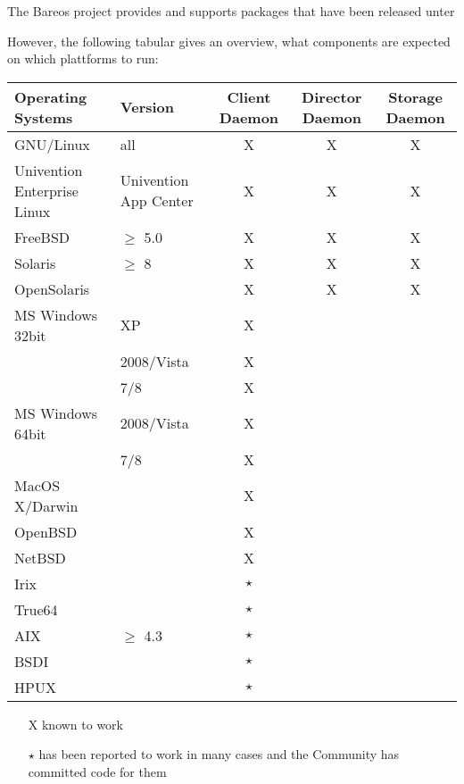 

The Bareos project provides and supports packages that have been released unter

However, the following tabular gives an overview, what components are expected on which plattforms to run:

\begin{tabular}[h]{|l|l|c|c|c|}
  \hline
  Operating Systems & Version & Client \small{Daemon} & Director \small{Daemon} & Storage \small{Daemon} \\
  \hline
  \hline
  GNU/Linux  & all & X & X & X \\
  \hline
  Univention Enterprise Linux & Univention App Center & X & X & X \\
  \hline
  FreeBSD & $\geq$ 5.0 & X & X & X
  \\
  \hline
  Solaris & $\geq$ 8 & X & X & X \\
  \hline
  OpenSolaris & ~ & X & X & X \\
  \hline
  \hline
  MS Windows 32bit & XP & X  &  &  \\
  ~ & 2008/Vista & X  &  &  \\
  ~ & 7/8 & X  &  &  \\
  \hline
  MS Windows 64bit& 2008/Vista & X  &  &  \\
  ~ & 7/8 & X  &  &  \\
  \hline
  \hline
  MacOS X/Darwin & ~ & X &  &  \\
  \hline
  OpenBSD & ~ & X &  & ~ \\
  \hline
  NetBSD & ~ & X &  & ~ \\
  \hline
  Irix & ~ & $\star$ & ~ & ~ \\
  \hline
  True64 & ~ & $\star$ & ~ & ~ \\
  \hline
  AIX & $\geq$ 4.3 & $\star$ & ~ & ~ \\
  \hline
  BSDI & ~ & $\star$ & ~ & ~ \\
  \hline
  HPUX & ~ & $\star$ & ~ & ~ \\
  \hline
\end{tabular}

\begin{itemize}
\item[X] known to work
\item[$\star$] has been reported to work in many cases and the Community
   has committed code for them
\end{itemize}


